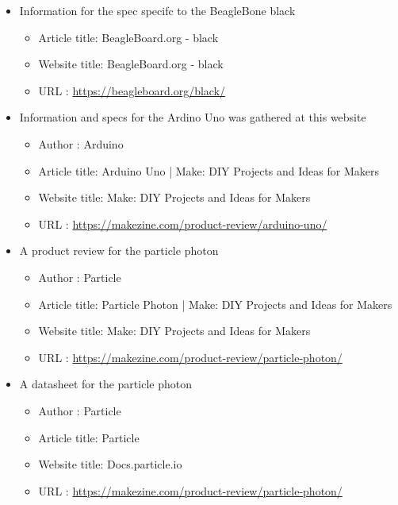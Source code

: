 \documentclass{article}
\begin{document}
\begin{thebibliography}{56}
\begin{itemize}
        \item Information for the spec specifc to the BeagleBone black
        \begin{itemize}
            \item Article title: BeagleBoard.org - black
            \item Website title: BeagleBoard.org - black
            \item URL          : \url{https://beagleboard.org/black/}
        \end{itemize}

    \end{itemize}

    \begin{itemize}
        \item Information and specs for the Ardino Uno was gathered at this website
        \begin{itemize}
            \item Author       : Arduino
            \item Article title: Arduino Uno | Make: DIY Projects and Ideas for Makers
            \item Website title: Make: DIY Projects and Ideas for Makers
            \item URL          : \url{https://makezine.com/product-review/arduino-uno/}
        \end{itemize}
    \end{itemize}

    \begin{itemize}
        \item A product review for the particle photon
        \begin{itemize}
            \item Author       : Particle
            \item Article title: Particle Photon | Make: DIY Projects and Ideas for Makers
            \item Website title: Make: DIY Projects and Ideas for Makers
            \item URL          : \url{https://makezine.com/product-review/particle-photon/}
        \end{itemize}

        \item A datasheet for the particle photon
        \begin{itemize}
            \item Author       : Particle
            \item Article title: Particle
            \item Website title: Docs.particle.io
            \item URL          : \url{https://makezine.com/product-review/particle-photon/}
        \end{itemize}
    \end{itemize}


\end{thebibliography}
\end{document}
